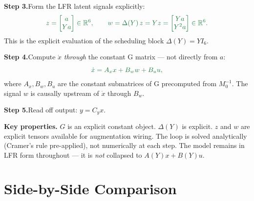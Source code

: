 \documentclass[11pt]{article}
\newcommand{\stepbox}[2]{%
  \noindent\textbf{Step #1.}\quad #2\par\medskip
}
\begin{document}
\stepbox{3}{Form the LFR latent signals explicitly:
\[
  {\color{newcolor}
  z = \begin{bmatrix} a \\ Ya \end{bmatrix} \in \mathbb{R}^6,
  \qquad
  w = \Delta(Y)\,z = Y z = \begin{bmatrix} Ya \\ Y^2 a \end{bmatrix} \in \mathbb{R}^6.
  }
\]
This is the explicit evaluation of the scheduling block $\Delta(Y) = YI_6$.}

\stepbox{4}{Compute $\dot{x}$ \emph{through} the constant G matrix — not directly from $a$:
\[
  {\color{newcolor} \dot{x} = A_x x + B_w w + B_u u,}
\]
where $A_x, B_w, B_u$ are the constant submatrices of G precomputed from $M_0^{-1}$.
The signal $w$ is causally upstream of $\dot{x}$ through $B_w$.}

\stepbox{5}{Read off output:
$y = C_y x$.}

\medskip

\begin{mdframed}[backgroundcolor=newcolor!8, linecolor=newcolor, linewidth=1pt]
\textbf{Key properties.} $G$ is an explicit constant object. $\Delta(Y)$ is
explicit. $z$ and $w$ are explicit tensors available for augmentation wiring.
The loop is solved analytically (Cramer's rule pre-applied), not numerically
at each step. The model remains in LFR form throughout — it is \emph{not}
collapsed to $A(Y)x + B(Y)u$.
\end{mdframed}

\section*{Side-by-Side Comparison}
\end{document}
